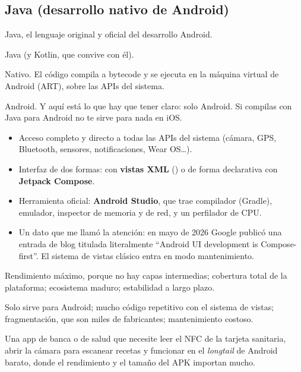 \subsection{Java (desarrollo nativo de Android)}

 Java, el lenguaje original y oficial del desarrollo Android.

 Java (y Kotlin, que convive con él).

 Nativo. El código compila a bytecode y se ejecuta en la máquina virtual de Android (ART), sobre las APIs del sistema.

 Android. Y aquí está lo que hay que tener claro: solo Android. Si compilas con Java para Android no te sirve para nada en iOS.

\begin{itemize}[leftmargin=*,itemsep=0.2em,topsep=0.2em]
  \item Acceso completo y directo a todas las APIs del sistema (cámara, GPS, Bluetooth, sensores, notificaciones, Wear OS\ldots).
  \item Interfaz de dos formas: con \textbf{vistas XML} () o de forma declarativa con \textbf{Jetpack Compose}.
  \item Herramienta oficial: \textbf{Android Studio}, que trae compilador (Gradle), emulador, inspector de memoria y de red, y un perfilador de CPU.
  \item Un dato que me llamó la atención: en mayo de 2026 Google publicó una entrada de blog titulada literalmente \enquote{Android UI development is Compose-first}. El sistema de vistas clásico entra en modo mantenimiento.
\end{itemize}

 Rendimiento máximo, porque no hay capas intermedias; cobertura total de la plataforma; ecosistema maduro; estabilidad a largo plazo.

 Solo sirve para Android; mucho código repetitivo con el sistema de vistas; fragmentación, que son miles de fabricantes; mantenimiento costoso.

 Una app de banca o de salud que necesite leer el NFC de la tarjeta sanitaria, abrir la cámara para escanear recetas y funcionar en el \emph{longtail} de Android barato, donde el rendimiento y el tamaño del APK importan mucho.

